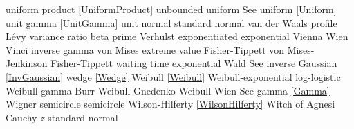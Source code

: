 uniform product 				\dotfill	\eqref{UniformProduct}				\ncite 	%
%
unbounded uniform 				\dotfill	See uniform \eqref{Uniform}			\ncite	%
unit gamma						\dotfill	\eqref{UnitGamma} 					\ncite	%
unit normal						\dotfill	standard normal 					\ncite	%
%
van der Waals profile 			\dotfill	L\'{e}vy 							\ncite	%
variance ratio					\dotfill	beta prime 							\ncite	%
Verhulst						\dotfill	exponentiated exponential					 
Vienna 							\dotfill	Wien 								\ncite	%
Vinci 							\dotfill	inverse gamma 						\ncite	%
von Mises extreme value			\dotfill	Fisher-Tippett 						\ncite	%
von Mises-Jenkinson 			\dotfill	Fisher-Tippett 						\ncite	%
%
waiting time					\dotfill	exponential 						\ncite	%
Wald							\dotfill	See inverse Gaussian	 \eqref{InvGaussian}				\ncite	%
wedge							\dotfill	\eqref{Wedge}  						\ncite	%
Weibull 						\dotfill	\eqref{Weibull} 					\ncite	%
Weibull-exponential 			\dotfill	log-logistic 						\ncite	%
Weibull-gamma					\dotfill	Burr								\ncite	%
Weibull-Gnedenko				\dotfill	Weibull 							\ncite	%
Wien							\dotfill	See gamma \eqref{Gamma}				\ncite	%
Wigner semicircle				\dotfill	semicircle 							\ncite	%
Wilson-Hilferty					\dotfill	\eqref{WilsonHilferty} 				\ncite	%
Witch of Agnesi					\dotfill	Cauchy									%
%	
$z$								\dotfill	standard normal 					\ncite	%



\clearpage

